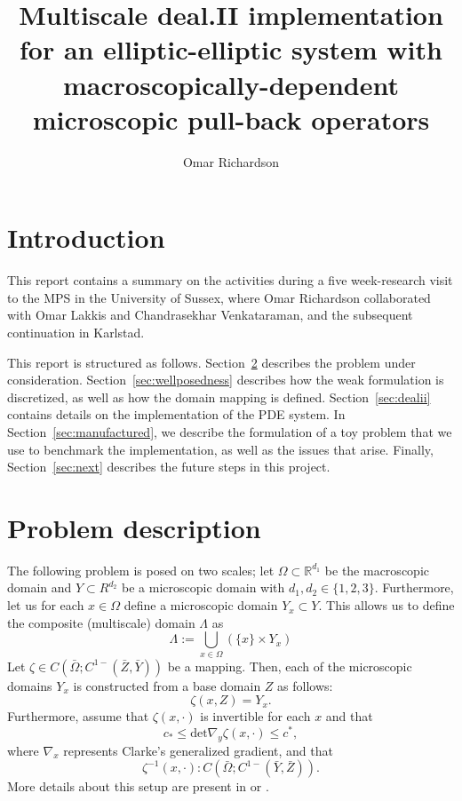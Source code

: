\documentclass{article}
\title{Multiscale deal.II implementation for an elliptic-elliptic system with macroscopically-dependent microscopic pull-back operators}
\author{Omar Richardson}
\newcommand{\R}{\mathbb{ R}}
\begin{document}
\maketitle

\section{Introduction}
This report contains a summary on the activities during a five week-research visit to the MPS in the University of Sussex, where Omar Richardson collaborated with Omar Lakkis and Chandrasekhar Venkataraman, and the subsequent continuation in Karlstad.

This report is structured as follows. Section~\ref{sec:problem} describes the problem under consideration.
Section~\ref{sec:wellposedness} describes how the weak formulation is discretized, as well as how the domain mapping is defined.
Section~\ref{sec:dealii} contains details on the implementation of the PDE system.
In Section~\ref{sec:manufactured}, we describe the formulation of a toy problem that we use to benchmark the implementation, as well as the issues that arise.
Finally, Section~\ref{sec:next} describes the future steps in this project.

\section{Problem description}
\label{sec:problem}
The following problem is posed on two scales; let $\Omega \subset \R^{d_1}$ be the macroscopic domain and $Y \subset R^{d_2}$ be a microscopic domain with $d_1,d_2 \in \{1,2,3\}$. Furthermore, let us for each $x \in \Omega$ define a microscopic domain $Y_x \subset Y$.
This allows us to define the composite (multiscale) domain $\Lambda$ as
\begin{equation*}
    \Lambda := \bigcup_{x\in\Omega} \left(  \{ x \} \times Y_x\right)
\end{equation*}
Let $\zeta \in C(\bar{\Omega};C^{1-}(\bar{Z},\bar{Y}))$ be a mapping. Then, each of the microscopic domains $Y_x$ is constructed from a base domain $Z$ as follows:
\begin{equation}
    \zeta(x,Z) = Y_x.
\end{equation}
Furthermore, assume that $\zeta(x,\cdot)$ is invertible for each $x$ and that
\begin{equation}
    c_*  \leq \mathrm{det}\nabla_y \zeta(x,\cdot) \leq c^*,
\end{equation}
where $\nabla_x$ represents Clarke's generalized gradient, and that
\begin{equation}
    \zeta^{-1}(x,\cdot):  C(\bar{\Omega};C^{1-}(\bar{Y},\bar{Z})).
\end{equation}
More details about this setup are present in \cite{sebamPhD} or \cite{lakkis13}.
\end{document}
